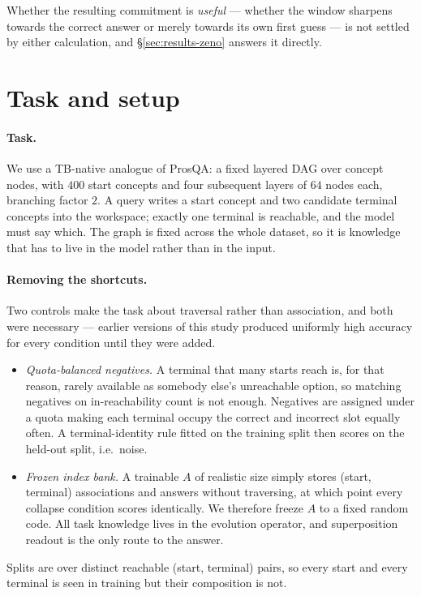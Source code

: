 \documentclass[11pt]{article}
\theoremstyle{definition}
\begin{document}
Whether the resulting commitment is \emph{useful} --- whether the window sharpens
towards the correct answer or merely towards its own first guess --- is not settled by
either calculation, and \S\ref{sec:results-zeno} answers it directly.

\section{Task and setup}
\label{sec:setup}

\paragraph{Task.} We use a TB-native analogue of ProsQA: a fixed layered DAG over
concept nodes, with $400$ start concepts and four subsequent layers of $64$ nodes
each, branching factor $2$. A query writes a start concept and two candidate terminal
concepts into the workspace; exactly one terminal is reachable, and the model must
say which. The graph is fixed across the whole dataset, so it is knowledge that has to
live in the model rather than in the input.

\paragraph{Removing the shortcuts.} Two controls make the task about traversal rather
than association, and both were necessary --- earlier versions of this study produced
uniformly high accuracy for every condition until they were added.
\begin{itemize}
\item \emph{Quota-balanced negatives.} A terminal that many starts reach is, for that
reason, rarely available as somebody else's unreachable option, so matching negatives
on in-reachability count is not enough. Negatives are assigned under a quota making
each terminal occupy the correct and incorrect slot equally often. A terminal-identity
rule fitted on the training split then scores \TerminalShortcut on the held-out
split, i.e.\ noise.
\item \emph{Frozen index bank.} A trainable $A$ of realistic size simply stores
(start, terminal) associations and answers without traversing, at which point every
collapse condition scores identically. We therefore freeze $A$ to a fixed random code.
All task knowledge lives in the evolution operator, and superposition readout is the
only route to the answer.
\end{itemize}
Splits are over distinct reachable (start, terminal) pairs, so every start and every
terminal is seen in training but their composition is not.
\end{document}

